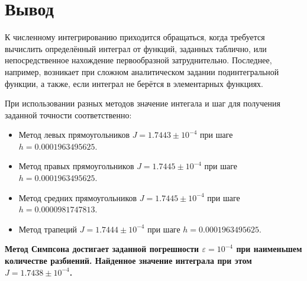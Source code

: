 \documentclass[a4paper,11pt]{article}
\begin{document}
\section{Вывод}

К численному интегрированию приходится обращаться, когда требуется вычислить определённый интеграл от функций, заданных таблично, или
непосредственное нахождение первообразной затруднительно. Последнее,
например, возникает при сложном аналитическом задании подинтегральной
функции, а также, если интеграл не берётся в элементарных функциях.

При использовании разных методов значение интегала и шаг для получения заданной точности соответственно:

\begin{itemize}
\item Метод левых прямоугольников $J = 1.7443 \pm 10^{-4}$ при шаге $h = 0.0001963495625$.
\item Метод правых прямоугольников $J = 1.7445 \pm 10^{-4}$ при шаге $h = 0.0001963495625$.
\item Метод средних прямоугольников $J = 1.7445 \pm 10^{-4}$ при шаге $h = 0.0000981747813$.
\item Метод трапеций $J = 1.7444 \pm 10^{-4}$ при шаге $h = 0.0001963495625$.
\end{itemize}

\textbf{Метод Симпсона достигает заданной погрешности $\varepsilon = 10^{-4}$ при наименьшем количестве разбиений. Найденное значение интеграла при этом $J = 1.7438\pm10^{-4}$.}
\end{document}
